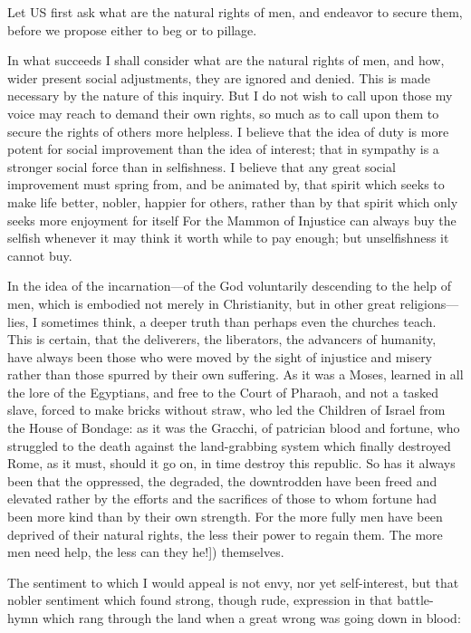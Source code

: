 \documentclass{book}
\begin{document}
Let US first ask what are the natural rights of men, and endeavor to secure them, before we propose either to beg or to pillage.

In what succeeds I shall consider what are the natural rights of men, and how, wider present social adjustments, they are ignored and denied. This is made necessary by the nature of this inquiry. But I do not wish to call upon those my voice may reach to demand their own rights, so much as to call upon them to secure the rights of others more helpless. I believe that the idea of duty is more potent for social improvement than the idea of interest; that in sympathy is a stronger social force than in selfishness. I believe that any great social improvement must spring from, and be animated by, that spirit which seeks to make life better, nobler, happier for others, rather than by that spirit which only seeks more enjoyment for itself For the Mammon of Injustice can always buy the selfish whenever it may think it worth while to pay enough; but unselfishness it cannot buy.

In the idea of the incarnation—of the God voluntarily descending to the help of men, which is embodied not merely in Christianity, but in other great religions—lies, I sometimes think, a deeper truth than perhaps even the churches teach. This is certain, that the deliverers, the liberators, the advancers of humanity, have always been those who were moved by the sight of injustice and misery rather than those spurred by their own suffering. As it was a Moses, learned in all the lore of the Egyptians, and free to the Court of Pharaoh, and not a tasked slave, forced to make bricks without straw, who led the Children of Israel from the House of Bondage: as it was the Gracchi, of patrician blood and fortune, who struggled to the death against the land-grabbing system which finally destroyed Rome, as it must, should it go on, in time destroy this republic. So has it always been that the oppressed, the degraded, the downtrodden have been freed and elevated rather by the efforts and the sacrifices of those to whom fortune had been more kind than by their own strength. For the more fully men have been deprived of their natural rights, the less their power to regain them. The more men need help, the less can they he!{]}) themselves.

The sentiment to which I would appeal is not envy, nor yet self-interest, but that nobler sentiment which found strong, though rude, expression in that battle-hymn which rang through the land when a great wrong was going down in blood:
\end{document}
